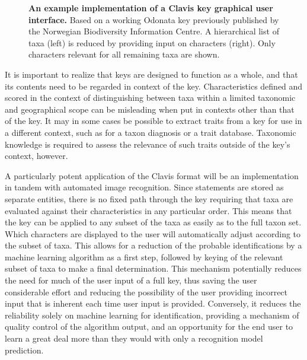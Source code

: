 \documentclass[10pt,letterpaper]{article}
\begin{document}
\begin{figure}[!h]
  \caption{{\bf An example implementation of a Clavis key graphical user interface.}
Based on a working Odonata key previously published by the Norwegian Biodiversity Information Centre. A hierarchical list of taxa (left) is reduced by providing input on characters (right). Only characters relevant for all remaining taxa are shown.
}
  \label{fig5}
\end{figure}

It is important to realize that keys are designed to function as a whole, and that its contents need to be regarded in context of the key. Characteristics defined and scored in the context of distinguishing between taxa within a limited taxonomic and geographical scope can be misleading when put in contexts other than that of the key. It may in some cases be possible to extract traits from a key for use in a different context, such as for a taxon diagnosis or a trait database. Taxonomic knowledge is required to assess the relevance of such traits outside of the key's context, however. 

A particularly potent application of the Clavis format will be an implementation in tandem with automated image recognition. Since statements are stored as separate entities, there is no fixed path through the key requiring that taxa are evaluated against their characteristics in any particular order. This means that the key can be applied to any subset of the taxa as easily as to the full taxon set. Which characters are displayed to the user will automatically adjust according to the subset of taxa. This allows for a reduction of the probable identifications by a machine learning algorithm as a first step, followed by keying of the relevant subset of taxa to make a final determination. This mechanism potentially reduces the need for much of the user input of a full key, thus saving the user considerable effort and reducing the possibility of the user providing incorrect input that is inherent each time user input is provided. Conversely, it reduces the reliability solely on machine learning for identification, providing a mechanism of quality control of the algorithm output, and an opportunity for the end user to learn a great deal more than they would with only a recognition model prediction.
\end{document}
